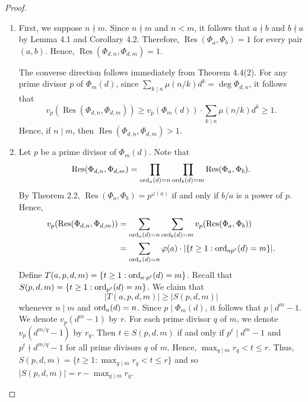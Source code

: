 \documentclass[10pt,leqno]{amsart}
\theoremstyle{definition}
\theoremstyle{remark}
\numberwithin{equation}{section}
\def\ord{{\rm ord}}
\newcommand{\res}{\operatorname{Res}}
\begin{document}
\begin{proof}
    \begin{enumerate}
        \item First, we suppose $n\nmid m$. Since $n\nmid m$ and $n<m$, it follows that $a\nmid b$ and $b\nmid a$ by Lemma 4.1 and Corollary 4.2. Therefore, $\res(\Phi_a,\Phi_b) = 1$ for every pair $(a,b)$. Hence, $\res(\Phi_{d,n},\Phi_{d,m}) = 1$.

        The converse direction follows immediately from Theorem 4.4(2). For any prime divisor $p$ of $\Phi_m(d)$, since $\sum_{k\mid n}\mu(n/k)d^k = \deg\Phi_{d,n}$, it follows that
        $$v_p(\res(\Phi_{d,n},\Phi_{d,m})) \geq v_p(\Phi_m(d))\cdot\sum_{k\mid n}\mu(n/k)d^k\geq 1.$$
        Hence, if $n\mid m$, then $\res(\Phi_{d,n},\Phi_{d,m})>1$.
        \item Let $p$ be a prime divisor of $\Phi_m(d)$. Note that
        $$\res(\Phi_{d,n},\Phi_{d,m}) = \prod_{\ord_a(d) = n}\prod_{\ord_b(d) = m}\res(\Phi_a,\Phi_b).$$
        By Theorem 2.2, $\res(\Phi_a,\Phi_b) = p^{\varphi(a)}$ if and only if $b/a$ is a power of $p$. Hence,
        \begin{align}
            v_p(\res(\Phi_{d,n},\Phi_{d,m})) &= \sum_{\ord_{a}(d) = n}\sum_{\ord_b(d) = m}v_p(\res(\Phi_a,\Phi_b))\notag\\
            &= \sum_{\ord_a(d) = n}\varphi(a)\cdot |\{t\geq 1: \ord_{ap^t}(d) = m\}|.
        \end{align}
        Define $T(a,p,d,m) = \{t\geq 1:\ord_{a\cdot p^t}(d) = m\}$. Recall that $S(p,d,m) = \{t\geq 1:\ord_{p^t}(d) = m\}$. We claim that
        $$|T(a,p,d,m)|\geq |S(p,d,m)|$$
        whenever $n\mid m$ and $\ord_a(d) = n$. Since $p\mid \Phi_m(d)$, it follows that $p\mid d^m-1$. We denote $v_p(d^m-1)$ by $r$. For each prime divisor $q$ of $m$, we denote $v_p(d^{m/q}-1)$ by $r_q$. Then $t\in S(p,d,m)$ if and only if $p^t\mid d^m-1$ and $p^t\nmid d^{m/q}-1$ for all prime divisors $q$ of $m$. Hence, $\max_{q\mid m}r_q<t\leq r$. Thus, $S(p,d,m) = \{t\geq 1:\max_{q\mid m}r_q<t\leq r\}$ and so $|S(p,d,m)| = r-\max_{q\mid m}r_q$.


\end{enumerate}
\end{proof}
\end{document}
